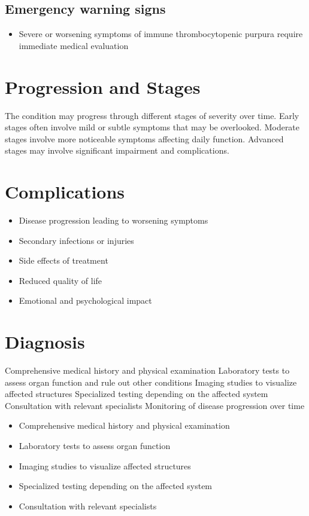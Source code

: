 \subsection{Emergency warning signs}
\begin{itemize}[noitemsep]
  \item Severe or worsening symptoms of immune thrombocytopenic purpura require immediate medical evaluation
\end{itemize}
\section{Progression and Stages}
The condition may progress through different stages of severity over time. Early stages often involve mild or subtle symptoms that may be overlooked. Moderate stages involve more noticeable symptoms affecting daily function. Advanced stages may involve significant impairment and complications.
\section{Complications}
\begin{itemize}[noitemsep]
  \item Disease progression leading to worsening symptoms
  \item Secondary infections or injuries
  \item Side effects of treatment
  \item Reduced quality of life
  \item Emotional and psychological impact
\end{itemize}
\section{Diagnosis}
Comprehensive medical history and physical examination Laboratory tests to assess organ function and rule out other conditions Imaging studies to visualize affected structures Specialized testing depending on the affected system Consultation with relevant specialists Monitoring of disease progression over time

\begin{itemize}[noitemsep]
  \item Comprehensive medical history and physical examination
  \item Laboratory tests to assess organ function
  \item Imaging studies to visualize affected structures
  \item Specialized testing depending on the affected system
  \item Consultation with relevant specialists
\end{itemize}
